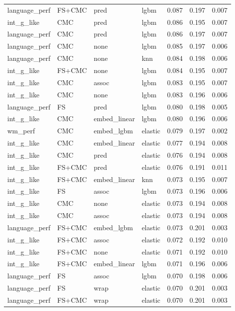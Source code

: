 \documentclass{article}
\begin{document}
\begin{table}
\begin{tabular}{llllrrr}
	language\_perf & FS+CMC & pred & lgbm & 0.087 & 0.197 & 0.007 \\
	int\_g\_like & CMC & pred & lgbm & 0.086 & 0.195 & 0.007 \\
	language\_perf & CMC & pred & lgbm & 0.086 & 0.197 & 0.007 \\
	language\_perf & CMC & none & lgbm & 0.085 & 0.197 & 0.006 \\
	language\_perf & CMC & none & knn & 0.084 & 0.198 & 0.006 \\
	int\_g\_like & FS+CMC & none & lgbm & 0.084 & 0.195 & 0.007 \\
	int\_g\_like & CMC & assoc & lgbm & 0.083 & 0.195 & 0.007 \\
	int\_g\_like & CMC & none & lgbm & 0.083 & 0.196 & 0.006 \\
	language\_perf & FS & pred & lgbm & 0.080 & 0.198 & 0.005 \\
	int\_g\_like & CMC & embed\_linear & lgbm & 0.080 & 0.196 & 0.006 \\
	wm\_perf & CMC & embed\_lgbm & elastic & 0.079 & 0.197 & 0.002 \\
	int\_g\_like & CMC & embed\_linear & elastic & 0.077 & 0.194 & 0.008 \\
	int\_g\_like & CMC & pred & elastic & 0.076 & 0.194 & 0.008 \\
	int\_g\_like & FS+CMC & pred & elastic & 0.076 & 0.191 & 0.011 \\
	int\_g\_like & FS+CMC & embed\_linear & knn & 0.073 & 0.195 & 0.007 \\
	int\_g\_like & FS & assoc & lgbm & 0.073 & 0.196 & 0.006 \\
	int\_g\_like & CMC & none & elastic & 0.073 & 0.194 & 0.008 \\
	int\_g\_like & CMC & assoc & elastic & 0.073 & 0.194 & 0.008 \\
	language\_perf & FS+CMC & embed\_lgbm & elastic & 0.073 & 0.201 & 0.003 \\
	int\_g\_like & FS+CMC & assoc & elastic & 0.072 & 0.192 & 0.010 \\
	int\_g\_like & FS+CMC & none & elastic & 0.071 & 0.192 & 0.010 \\
	int\_g\_like & FS+CMC & embed\_linear & lgbm & 0.071 & 0.196 & 0.006 \\
	language\_perf & FS & assoc & lgbm & 0.070 & 0.198 & 0.006 \\
	language\_perf & FS & wrap & elastic & 0.070 & 0.201 & 0.003 \\
	language\_perf & FS+CMC & wrap & elastic & 0.070 & 0.201 & 0.003 \\

\end{tabular}
\end{table}
\end{document}
